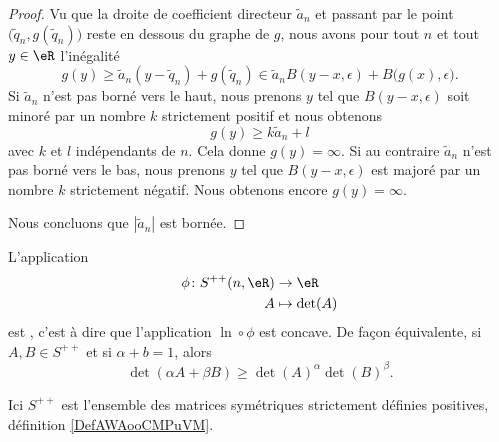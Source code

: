 \begin{proof}
    Vu que la droite de coefficient directeur \( \tilde a_n\) et passant par le point \( \big( \tilde q_n,g(\tilde q_n) \big)\) reste en dessous du graphe de \( g\), nous avons pour tout \( n\) et tout \( y\in \eR\) l'inégalité
    \begin{equation}
        g(y)\geq \tilde a_n(y-\tilde q_n)+g(\tilde q_n)\in \tilde a_nB(y-x,\epsilon)+B\big( g(x),\epsilon \big).
    \end{equation}
    Si \( \tilde a_n\) n'est pas borné vers le haut, nous prenons \( y\) tel que \( B(y-x,\epsilon)\) soit minoré par un nombre \( k\) strictement positif et nous obtenons
    \begin{equation}
        g(y)\geq k\tilde a_n+l
    \end{equation}
    avec \( k\) et \( l\) indépendants de \( n\). Cela donne \( g(y)=\infty\). Si au contraire \( \tilde a_n\) n'est pas borné vers le bas, nous prenons $y$ tel que \( B(y-x,\epsilon)\) est majoré par un nombre \( k\) strictement négatif. Nous obtenons encore \( g(y)=\infty\).

    Nous concluons que \( | \tilde a_n |\) est bornée.
\end{proof}

\begin{lemma}   \label{LemXOUooQsigHs}
    L'application
    \begin{equation}
        \begin{aligned}
            \phi\colon S^{++}(n,\eR)&\to \eR \\
            A&\mapsto \det(A) 
        \end{aligned}
    \end{equation}
    est , c'est à dire que l'application \( \ln\circ\phi\) est concave. De façon équivalente, si \( A,B\in S^{++}\) et si \( \alpha+b=1\), alors
    \begin{equation}    \label{EqSPKooHFZvmB}
        \det(\alpha A+\beta B)\geq \det(A)^{\alpha}\det(B)^{\beta}.
    \end{equation}
\end{lemma}
Ici \( S^{++}\) est l'ensemble des matrices symétriques strictement définies positives, définition \ref{DefAWAooCMPuVM}.

